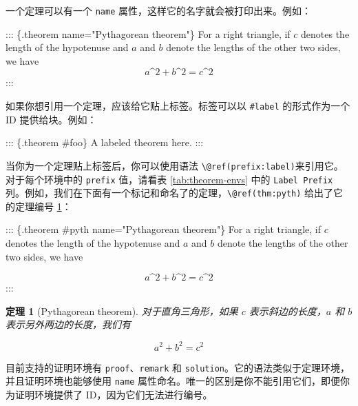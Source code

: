 \documentclass[
  12pt,
]{krantz}
\newenvironment{Shaded}{\begin{snugshade}}{\end{snugshade}}
\newcommand{\NormalTok}[1]{#1}
\newtheorem{theorem}{定理}[chapter]
\theoremstyle{definition}
\theoremstyle{definition}
\theoremstyle{definition}
\theoremstyle{definition}
\theoremstyle{remark}
\begin{document}
一个定理可以有一个 \texttt{name} 属性，这样它的名字就会被打印出来。例如：

\begin{Shaded}
\begin{Highlighting}[]
\NormalTok{::: \{.theorem name="Pythagorean theorem"\}}
\NormalTok{For a right triangle, if $c$ denotes the length of the hypotenuse}
\NormalTok{and $a$ and $b$ denote the lengths of the other two sides, we have}
\NormalTok{$$a\^{}2 + b\^{}2 = c\^{}2$$}
\NormalTok{:::}
\end{Highlighting}
\end{Shaded}

如果你想引用一个定理，应该给它贴上标签。标签可以以 \texttt{\#label} 的形式作为一个 ID 提供给块。例如：

\begin{Shaded}
\begin{Highlighting}[]
\NormalTok{::: \{.theorem \#foo\}}
\NormalTok{A labeled theorem here.}
\NormalTok{:::}
\end{Highlighting}
\end{Shaded}

当你为一个定理贴上标签后，你可以使用语法 \texttt{\textbackslash{}@ref(prefix:label)}来引用它。对于每个环境中的 \texttt{prefix} 值，请看表 \ref{tab:theorem-envs} 中的 \texttt{Label\ Prefix} 列。例如，我们在下面有一个标记和命名了的定理，\texttt{\textbackslash{}@ref(thm:pyth)} 给出了它的定理编号 \ref{thm:pyth}：

\begin{Shaded}
\begin{Highlighting}[]
\NormalTok{::: \{.theorem \#pyth name="Pythagorean theorem"\}}
\NormalTok{For a right triangle, if $c$ denotes the length of the hypotenuse}
\NormalTok{and $a$ and $b$ denote the lengths of the other two sides, we have}

\NormalTok{$$a\^{}2 + b\^{}2 = c\^{}2$$}
\NormalTok{:::}
\end{Highlighting}
\end{Shaded}

\begin{theorem}[Pythagorean theorem]
\protect\hypertarget{thm:pyth}{}\label{thm:pyth}对于直角三角形，如果 \(c\) 表示斜边的长度，\(a\) 和 \(b\) 表示另外两边的长度，我们有

\[a^2 + b^2 = c^2\]
\end{theorem}

目前支持的证明环境有 \texttt{proof}、\texttt{remark} 和 \texttt{solution}。它的语法类似于定理环境，并且证明环境也能够使用 \texttt{name} 属性命名。唯一的区别是你不能引用它们，即便你为证明环境提供了 ID，因为它们无法进行编号。
\end{document}
